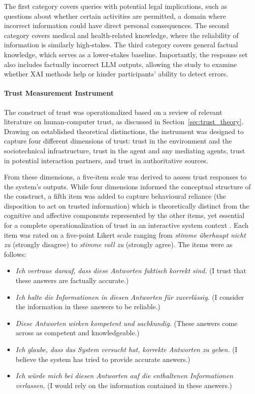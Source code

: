 The first category covers queries with potential legal implications, such as questions about whether certain activities are permitted, a domain where incorrect information could have direct personal consequences. The second category covers medical and health-related knowledge, where the reliability of information is similarly high-stakes. The third category covers general factual knowledge, which serves as a lower-stakes baseline. Importantly, the response set also includes factually incorrect LLM outputs, allowing the study to examine whether XAI methods help or hinder participants' ability to detect errors.

\paragraph{Trust Measurement Instrument}
\label{sec:trust_instrument}

The construct of trust was operationalized based on a review of relevant literature on human-computer trust, as discussed in Section~\ref{sec:trust_theory}. Drawing on established theoretical distinctions, the instrument was designed to capture four different dimensions of trust: trust in the environment and the sociotechnical infrastructure, trust in the agent and any mediating agents, trust in potential interaction partners, and trust in authoritative sources. \cite{castelfranchi_trust_2001, falcone_social_2001, jones_concept_2002}

From these dimensions, a five-item scale was derived to assess trust responses to the system's outputs. While four dimensions informed the conceptual structure of the construct, a fifth item was added to capture behavioural reliance (the disposition to act on trusted information) which is theoretically distinct from the cognitive and affective components represented by the other items, yet essential for a complete operationalization of trust in an interactive system context \cite{mayer_integrative_1995}. Each item was rated on a five-point Likert scale ranging from \textit{stimme überhaupt nicht zu} (strongly disagree) to \textit{stimme voll zu} (strongly agree). The items were as follows:

\begin{itemize}
    \item \textit{Ich vertraue darauf, dass diese Antworten faktisch korrekt sind.} (I trust that these answers are factually accurate.)
    \item \textit{Ich halte die Informationen in diesen Antworten für zuverlässig.} (I consider the information in these answers to be reliable.)
    \item \textit{Diese Antworten wirken kompetent und sachkundig.} (These answers come across as competent and knowledgeable.)
    \item \textit{Ich glaube, dass das System versucht hat, korrekte Antworten zu geben.} (I believe the system has tried to provide accurate answers.)
    \item \textit{Ich würde mich bei diesen Antworten auf die enthaltenen Informationen verlassen.} (I would rely on the information contained in these answers.)
\end{itemize}

